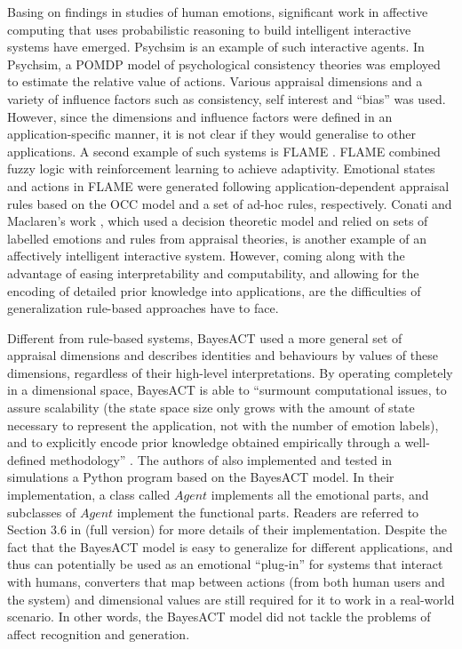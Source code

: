 Basing on findings in studies of human emotions, significant work in affective computing that uses probabilistic reasoning to build intelligent interactive systems have emerged. Psychsim \cite{pynadath2005psychsim} is an example of such interactive agents. In Psychsim, a POMDP model of psychological consistency theories was employed to estimate the relative value of actions. Various appraisal dimensions and a variety of influence factors such as consistency, self interest and ``bias'' was used. However, since the dimensions and influence factors were defined in an application-specific manner, it is not clear if they would generalise to other applications. A second example of such systems is FLAME \cite{el2000flame}. FLAME combined fuzzy logic with reinforcement learning to achieve adaptivity. Emotional states and actions in FLAME were generated following application-dependent appraisal rules based on the OCC model \cite{ortony1990cognitive} and a set of ad-hoc rules, respectively. Conati and Maclaren's work \cite{conati2009empirically}, which used a decision theoretic model and relied on sets of labelled emotions and rules from appraisal theories, is another example of an affectively intelligent interactive system. However, coming along with the advantage of easing interpretability and computability, and allowing for the encoding of detailed prior knowledge into applications, are the difficulties of generalization rule-based approaches have to face.

Different from rule-based systems, BayesACT \cite{hoey2013bayesian} used a more general set of appraisal dimensions and describes identities and behaviours by values of these dimensions, regardless of their high-level interpretations. By operating completely in a dimensional space, BayesACT is able to ``surmount computational issues, to assure scalability (the state space size only grows with the amount of state necessary to represent the application, not with the number of emotion labels), and to explicitly encode prior knowledge obtained empirically through a well-defined methodology'' \cite{hoey2013bayesian}. The authors of \cite{hoey2013bayesian} also implemented and tested in simulations a Python program based on the BayesACT model. In their implementation, a class called $Agent$ implements all the emotional parts, and subclasses of $Agent$ implement the functional parts. Readers are referred to Section 3.6 in \cite{hoey2013bayesian} (full version) for more details of their implementation. Despite the fact that the BayesACT model is easy to generalize for different applications, and thus can potentially be used as an emotional ``plug-in'' for systems that interact with humans, converters that map between actions (from both human users and the system) and dimensional values are still required for it to work in a real-world scenario. In other words, the BayesACT model did not tackle the problems of affect recognition and generation.


